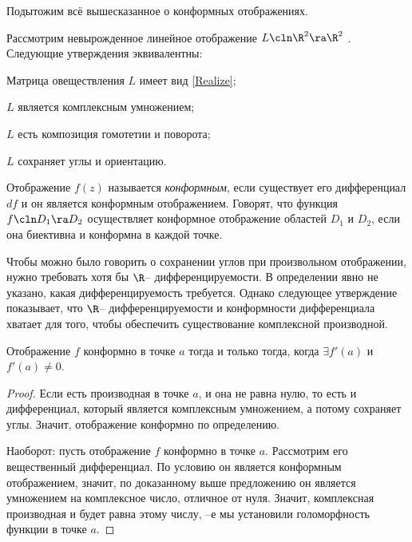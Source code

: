 \documentclass[a4paper]{article}
\begin{document}
Подытожим всё вышесказанное о конформных отображениях.

\begin{stm}
Рассмотрим невырожденное линейное отображение $L\cln \R^2 \ra \R^2$ . Следующие утверждения эквивалентны:
\begin{items}{-2}
\item Матрица овеществления $L$ имеет вид \eqref{Realize};
\item $L$ является комплексным умножением;
\item $L$ есть композиция гомотетии и поворота;
\item $L$ сохраняет углы и ориентацию.
\end{items}
\end{stm}

\begin{df}
Отображение $f(z)$ называется \emph{конформным}, если существует его дифференциал $df$ и он является
конформным отображением. Говорят, что функция $f\cln D_1 \ra D_2$ осуществляет конформное отображение
областей $D_1$ и $D_2$, если она биективна и конформна в каждой точке.
\end{df}

\begin{note}
Чтобы можно было говорить о сохранении углов при произвольном отображении, нужно требовать
хотя бы $\R$-- дифференцируемости. В определении явно не указано, какая дифференцируемость требуется.
Однако следующее утверждение показывает, что $\R$-- дифференцируемости и конформности дифференциала
хватает для того, чтобы обеспечить существование комплексной производной.
\end{note}

\begin{stm}
Отображение $f$ конформно в точке $a$ тогда и только тогда, когда $\exi f'(a)$ и $f'(a) \neq 0$.
\end{stm}
\begin{proof}
Если есть производная в точке $a$, и она не равна нулю, то есть и дифференциал, который является комплексным умножением,
а потому сохраняет углы. Значит, отображение конформно по определению.

Наоборот: пусть отображение $f$ конформно в точке $a$. Рассмотрим его вещественный дифференциал. По условию он является
конформным отображением, значит, по доказанному выше предложению он является умножением на комплексное число,
отличное от нуля. Значит, комплексная производная и будет равна этому числу, --е  мы установили голоморфность
функции в точке $a$.
\end{proof}
\end{document}
